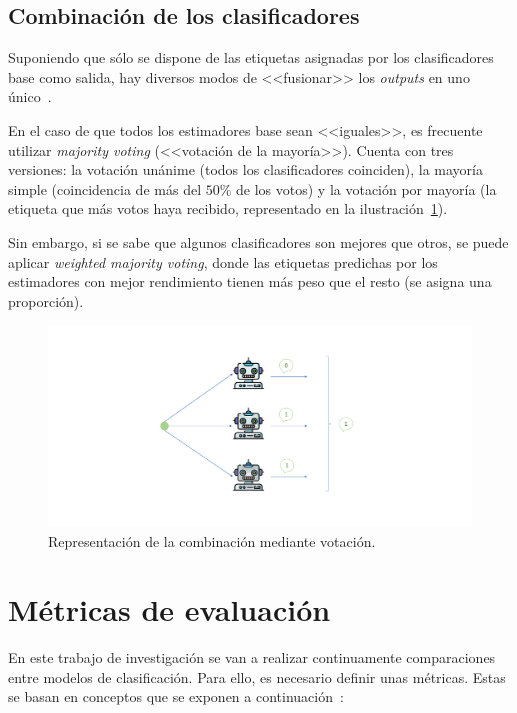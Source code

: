 \subsection{Combinación de los clasificadores}

Suponiendo que sólo se dispone de las etiquetas asignadas por los clasificadores base como salida, hay diversos modos de <<fusionar>> los \textit{outputs} en uno único~\cite{ensembles2006robi}.

En el caso de que todos los estimadores base sean <<iguales>>, es frecuente utilizar \textit{majority voting} (<<votación de la mayoría>>). Cuenta con tres versiones: la votación unánime (todos los clasificadores coinciden), la mayoría simple (coincidencia de más del $50\%$ de los votos) y la votación por mayoría (la etiqueta que más votos haya recibido, representado en la ilustración~\ref{img:voting}).

Sin embargo, si se sabe que algunos clasificadores son mejores que otros, se puede aplicar \textit{weighted majority voting}, donde las etiquetas predichas por los estimadores con mejor rendimiento tienen más peso que el resto (se asigna una proporción).

\begin{figure}[h]
	\caption[Combinación mediante votación en \textit{ensembles}]{Representación de la combinación mediante votación.}
	\label{img:voting}
	\centering
	\includegraphics[scale=0.35]{../img/memoria/3_voting}
\end{figure}



\section{Métricas de evaluación}

En este trabajo de investigación se van a realizar continuamente comparaciones entre modelos de clasificación. Para ello, es necesario definir unas métricas. Estas se basan en conceptos que se exponen a continuación~\cite{apuntesSisint}:

